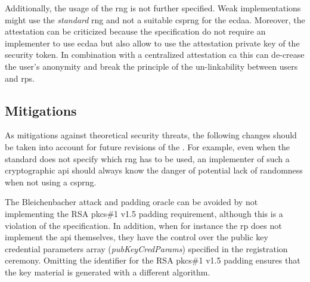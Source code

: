 Additionally, the usage of the \gls{rng} is not further specified. Weak implementations might use the \textit{standard} \gls{rng} and not a suitable \gls{csprng} for the \gls{ecdaa}. Moreover, the attestation can be criticized because the specification do not require an implementer to use \gls{ecdaa} but also allow to use the attestation private key of the security token. In combination with a centralized attestation \gls{ca} this can de-crease the user's anonymity and break the principle of the un-linkability between users and \glspl{rp}.

\subsection{Mitigations}

As mitigations against theoretical security threats, the following changes should be taken into account for future revisions of the \wa{}. For example, even when the standard does not specify which \gls{rng} has to be used, an implementer of such a cryptographic \gls{api} should always know the danger of potential lack of randomness when not using a \gls{csprng}. 

The Bleichenbacher attack and padding oracle can be avoided by not implementing the RSA \gls{pkcs}\#1 v1.5 padding requirement, although this is a violation of the specification. In addition, when for instance the \gls{rp} does not implement the \gls{api} themselves, they have the control over the public key credential parameters array (\textit{pubKeyCredParams}) specified in the registration ceremony. Omitting the identifier for the RSA \gls{pkcs}\#1 v1.5 padding ensures that the key material is generated with a different algorithm.

